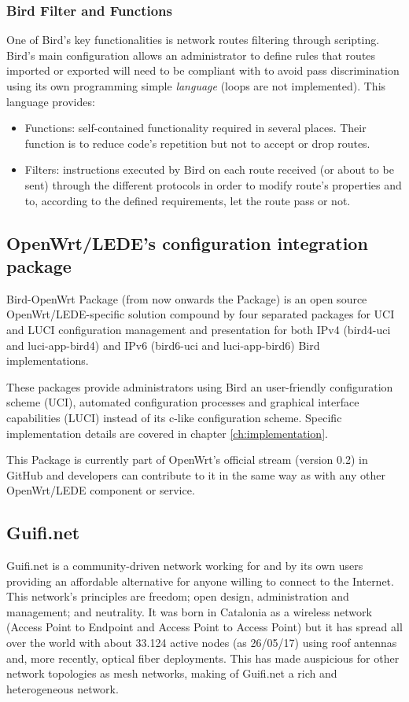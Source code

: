 \subsubsection{Bird Filter and Functions}
\label{sub:sub:filfun}
One of Bird's key functionalities is network routes filtering through scripting. Bird's main configuration allows an administrator to define rules that routes imported or exported will need to be compliant with to avoid pass discrimination using its own programming simple \textit{language} (loops are not implemented). This language provides:
\begin{itemize}
    \item Functions: self-contained functionality required in several places. Their function is to reduce code's repetition but not to accept or drop routes.
    \item Filters: instructions executed by Bird on each route received (or about to be sent) through the different protocols in order to modify route's properties and to, according to the defined requirements, let the route pass or not.     
\end{itemize} 

\subsection{OpenWrt/LEDE's configuration integration package}
Bird-OpenWrt Package (from now onwards the Package) is an open source OpenWrt/LEDE-specific solution compound by four separated packages for UCI and LUCI configuration management and presentation for both IPv4 (bird4-uci and luci-app-bird4) and IPv6 (bird6-uci and luci-app-bird6) Bird implementations.

These packages provide administrators using Bird an user-friendly configuration scheme (UCI), automated configuration processes and graphical interface capabilities (LUCI) instead of its c-like configuration scheme. Specific implementation details are covered in chapter \ref{ch:implementation}.

This Package is currently part of OpenWrt's official stream (version 0.2) in GitHub and developers can contribute to it in the same way as with any other OpenWrt/LEDE component or service.

\subsection{Guifi.net}
\label{subsec:gn}
Guifi.net is a community-driven network working for and by its own users providing an affordable alternative for anyone willing to connect to the Internet. This network's principles are freedom; open design, administration and management; and neutrality. It was born in Catalonia as a wireless network (Access Point to Endpoint and Access Point to Access Point) but it has spread all over the world with about 33.124 active nodes (as 26/05/17) using roof antennas and, more recently, optical fiber deployments. This has made auspicious for other network topologies as mesh networks, making of Guifi.net a rich and heterogeneous network.


